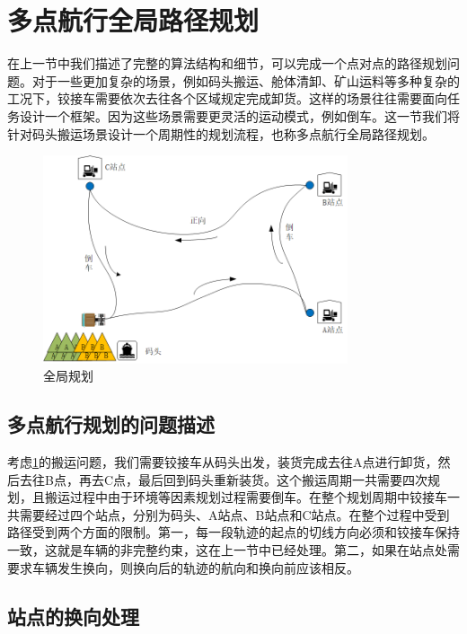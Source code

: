 \documentclass[master,academic]{ysuthesis} %
\begin{document}
	\section{多点航行全局路径规划}
	在上一节中我们描述了完整的算法结构和细节，可以完成一个点对点的路径规划问题。对于一些更加复杂的场景，例如码头搬运、舱体清卸、矿山运料等多种复杂的工况下，铰接车需要依次去往各个区域规定完成卸货。这样的场景往往需要面向任务设计一个框架。因为这些场景需要更灵活的运动模式，例如倒车。这一节我们将针对码头搬运场景设计一个周期性的规划流程，也称多点航行全局路径规划。
	\begin{figure}[!ht]
		\centering
		\includegraphics[width=0.8\textwidth]{全局规划.png}
		\caption{全局规划}
		\label{fig:全局规划}
	\end{figure}
		\subsection{多点航行规划的问题描述}
		考虑\ref{fig:全局规划}的搬运问题，我们需要铰接车从码头出发，装货完成去往A点进行卸货，然后去往B点，再去C点，最后回到码头重新装货。这个搬运周期一共需要四次规划，且搬运过程中由于环境等因素规划过程需要倒车。在整个规划周期中铰接车一共需要经过四个站点，分别为码头、A站点、B站点和C站点。在整个过程中受到路径受到两个方面的限制。第一，每一段轨迹的起点的切线方向必须和铰接车保持一致，这就是车辆的非完整约束，这在上一节中已经处理。第二，如果在站点处需要求车辆发生换向，则换向后的轨迹的航向和换向前应该相反。 

		\subsection{站点的换向处理}
		
\end{document}
